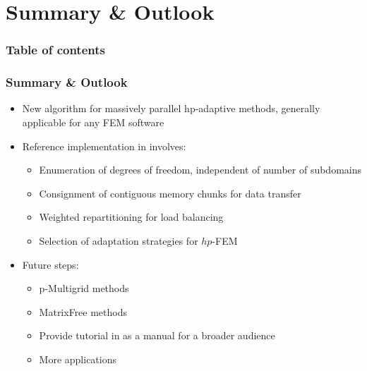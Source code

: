 \section{Summary \& Outlook}





\begin{frame}
\frametitle{Table of contents}

\tableofcontents[currentsection]
\end{frame}





\begin{frame}
\frametitle{Summary \& Outlook}

\begin{itemize}
\item New algorithm for massively parallel hp-adaptive methods, generally applicable for any FEM software
\item Reference implementation in \dealii{} involves:
  \begin{itemize}
  \item Enumeration of degrees of freedom, independent of number of subdomains
  \item Consignment of contiguous memory chunks for data transfer
  \item Weighted repartitioning for load balancing
  \item Selection of adaptation strategies for $hp$-FEM
  \end{itemize}
\end{itemize}

\vfill{}

\begin{itemize}
\item Future steps:
  \begin{itemize}
  \item p-Multigrid methods
  \item MatrixFree methods
  \item Provide tutorial in \dealii{} as a manual for a broader audience
  \item More applications
  \end{itemize}
\end{itemize}
\end{frame}